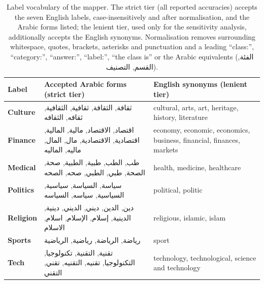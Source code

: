 \documentclass[preprint,12pt,authoryear]{elsarticle}
\newcommand{\RTL}[1]{\foreignlanguage{arabic}{#1}} %
\providecommand{\DIFaddbegin}{} %
\begin{document}
\DIFaddbegin \begin{table}[H]
\centering
\caption{Label vocabulary of the mapper. The strict tier (all reported accuracies) accepts the seven English labels, case-insensitively and after normalisation, and the Arabic forms listed; the lenient tier, used only for the sensitivity analysis, additionally accepts the English synonyms. Normalisation removes surrounding whitespace, quotes, brackets, asterisks and punctuation and a leading ``class:'', ``category:'', ``answer:'', ``label:'', ``the class is'' or the Arabic equivalents (\RTL{الفئة}, \RTL{القسم}, \RTL{التصنيف}).}
\label{tab:vocab}
\small
\begin{tabularx}{\textwidth}{@{}l >{\raggedright\arraybackslash}X >{\raggedright\arraybackslash}p{4.2cm}@{}}
\toprule
\textbf{Label} & \textbf{Accepted Arabic forms (strict tier)} & \textbf{English synonyms (lenient tier)} \\
\midrule
\textbf{Culture} & \RTL{ثقافة}, \RTL{الثقافة}, \RTL{ثقافية}, \RTL{الثقافية}, \RTL{ثقافه}, \RTL{الثقافه} & cultural, arts, art, heritage, history, literature \\
\textbf{Finance} & \RTL{اقتصاد}, \RTL{الاقتصاد}, \RTL{مالية}, \RTL{المالية}, \RTL{اقتصادية}, \RTL{الاقتصادية}, \RTL{مال}, \RTL{المال}, \RTL{ماليه}, \RTL{الماليه} & economy, economic, economics, business, financial, finances, markets \\
\textbf{Medical} & \RTL{طب}, \RTL{الطب}, \RTL{طبية}, \RTL{الطبية}, \RTL{صحة}, \RTL{الصحة}, \RTL{طبي}, \RTL{الطبي}, \RTL{صحه}, \RTL{الصحه} & health, medicine, healthcare \\
\textbf{Politics} & \RTL{سياسة}, \RTL{السياسة}, \RTL{سياسية}, \RTL{السياسية}, \RTL{سياسه}, \RTL{السياسه} & political, politic \\
\textbf{Religion} & \RTL{دين}, \RTL{الدين}, \RTL{ديني}, \RTL{الديني}, \RTL{دينية}, \RTL{الدينية}, \RTL{إسلام}, \RTL{الإسلام}, \RTL{اسلام}, \RTL{الاسلام} & religious, islamic, islam \\
\textbf{Sports} & \RTL{رياضة}, \RTL{الرياضة}, \RTL{رياضية}, \RTL{الرياضية} & sport \\
\textbf{Tech} & \RTL{تقنية}, \RTL{التقنية}, \RTL{تكنولوجيا}, \RTL{التكنولوجيا}, \RTL{تقنيه}, \RTL{التقنيه}, \RTL{تقني}, \RTL{التقني} & technology, technological, science and technology \\
\bottomrule
\end{tabularx}
\end{table}
\end{document}
